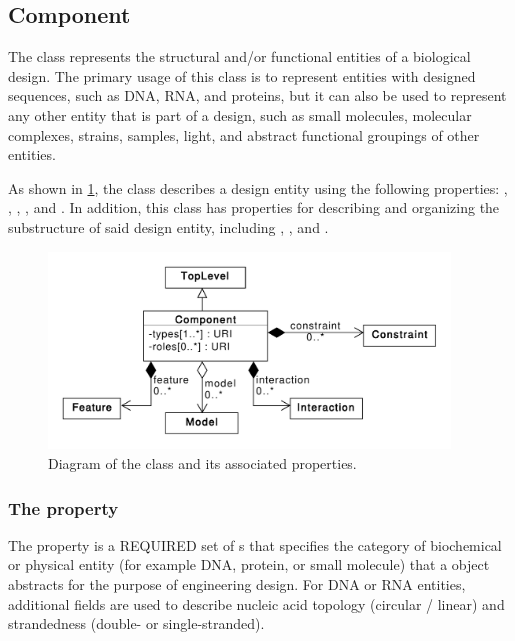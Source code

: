 \subsection{Component}
\label{sec:Component}

The  class represents the structural and/or functional entities of a biological design. The primary usage of this class is to represent entities with designed sequences, such as DNA, RNA, and proteins, but it can also be used to represent any other entity that is part of a design, such as small molecules, molecular complexes, strains, samples, light, and abstract functional groupings of other entities.

As shown in \ref{uml:component}, the  class describes a design entity using the following properties: , , , , and . 
In addition, this class has properties for describing and organizing the substructure of said design entity, including , , and .

\begin{figure}[ht]
\begin{center}
\includegraphics[width=0.95\textwidth]{uml/component}
\caption[]{Diagram of the  class and its associated properties.}
\label{uml:component}
\end{center}
\end{figure}

\subsubsection*{The  property}
\label{sec:types:CD}

The  property is a REQUIRED set of s that
specifies the category of biochemical or physical entity (for example DNA,
protein, or small molecule) that a  object abstracts
for the purpose of engineering design. For DNA or RNA entities,
additional  fields are used to describe nucleic acid
topology (circular / linear) and strandedness (double- or single-stranded).

